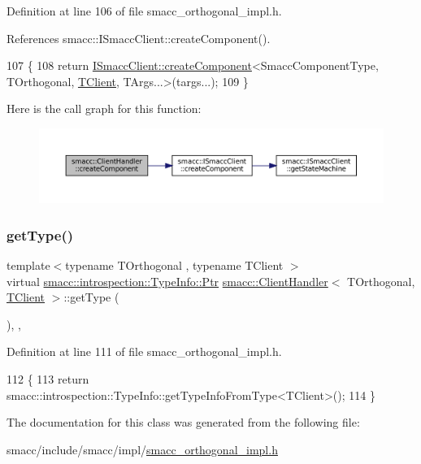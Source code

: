 Definition at line 106 of file smacc\+\_\+orthogonal\+\_\+impl.\+h.



References smacc\+::\+I\+Smacc\+Client\+::create\+Component().


\begin{DoxyCode}
107     \{
108         \textcolor{keywordflow}{return} \hyperlink{classsmacc_1_1ISmaccClient_a5c1c8eb5e91a3b399662a52cb0ca86aa}{ISmaccClient::createComponent}<SmaccComponentType, TOrthogonal, 
      \hyperlink{classTClient}{TClient}, TArgs...>(targs...);
109     \}
\end{DoxyCode}
Here is the call graph for this function\+:
\nopagebreak
\begin{figure}[H]
\begin{center}
\leavevmode
\includegraphics[width=350pt]{classsmacc_1_1ClientHandler_a4a9adad4c37104586c9b595d9030bb3c_cgraph}
\end{center}
\end{figure}
\mbox{\label{classsmacc_1_1ClientHandler_a018a50262de782c479414cf18daddac9}} 
\subsubsection{\texorpdfstring{get\+Type()}{getType()}}
{\footnotesize\ttfamily template$<$typename T\+Orthogonal , typename T\+Client $>$ \\
virtual \hyperlink{classsmacc_1_1introspection_1_1TypeInfo_aa6ffd9c39811d59f7c771941b7fad860}{smacc\+::introspection\+::\+Type\+Info\+::\+Ptr} \hyperlink{classsmacc_1_1ClientHandler}{smacc\+::\+Client\+Handler}$<$ T\+Orthogonal, \hyperlink{classTClient}{T\+Client} $>$\+::get\+Type (\begin{DoxyParamCaption}{ }\end{DoxyParamCaption})\hspace{0.3cm}{\ttfamily [inline]}, {\ttfamily [override]}, {\ttfamily [virtual]}}



Definition at line 111 of file smacc\+\_\+orthogonal\+\_\+impl.\+h.


\begin{DoxyCode}
112     \{
113         \textcolor{keywordflow}{return} smacc::introspection::TypeInfo::getTypeInfoFromType<TClient>();
114     \}
\end{DoxyCode}


The documentation for this class was generated from the following file\+:\begin{DoxyCompactItemize}
\item 
smacc/include/smacc/impl/\hyperlink{smacc__orthogonal__impl_8h}{smacc\+\_\+orthogonal\+\_\+impl.\+h}\end{DoxyCompactItemize}
